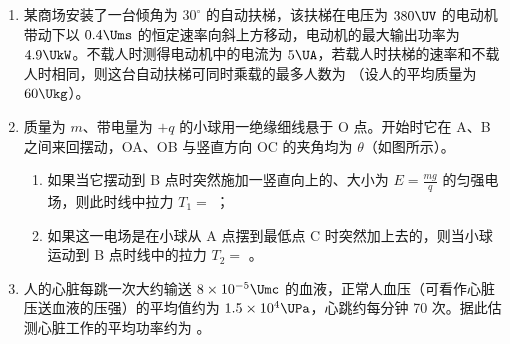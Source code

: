 \documentclass[\gkver]{gaokaozhenti}
\begin{document}
\begin{enumerate}
\onepicture[align=right, w=3.73cm]{}


\item
某商场安装了一台倾角为 $30^{\circ}$ 的自动扶梯，该扶梯在电压为 $380\UV$ 的电动机带动下以 $0.4\Ums$ 的恒定速率向斜上方移动，电动机的最大输出功率为 $4.9\UkW$。不载人时测得电动机中的电流为 $5\UA$，若载人时扶梯的速率和不载人时相同，则这台自动扶梯可同时乘载的最多人数为 （设人的平均质量为 $60\Ukg$）。


\item
质量为 $m$、带电量为 $+q$ 的小球用一绝缘细线悬于 O 点。开始时它在 A、B 之间来回摆动，OA、OB 与竖直方向 OC 的夹角均为 $\theta$（如图所示）。
\begin{enumerate}
	\item
	如果当它摆动到 B 点时突然施加一竖直向上的、大小为 $E = \frac{mg}{q}$ 的匀强电场，则此时线中拉力 $T_{1} =$ ；
	\item
	如果这一电场是在小球从 A 点摆到最低点 C 时突然加上去的，则当小球运动到 B 点时线中的拉力 $T_{2} =$ 。
\end{enumerate}

\onepicture[align=right, h=3.52cm]{}


\item
人的心脏每跳一次大约输送 $8 \times 10^{-5}\Umc$ 的血液，正常人血压（可看作心脏压送血液的压强）的平均值约为 $1.5 \times 10^{4}\UPa$，心跳约每分钟 70 次。据此估测心脏工作的平均功率约为 \tkanswer[1.9cm]{$1.4\UW$}。


\end{enumerate}
\end{document}
